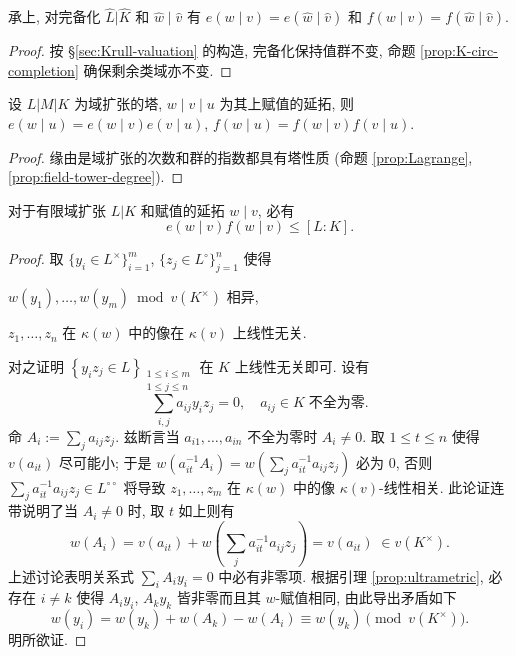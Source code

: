 \begin{proposition}\label{prop:ef-completion}
	承上, 对完备化 $\hat{L} | \hat{K}$ 和 $\hat{w} \mid \hat{v}$ 有 $e(w \mid v) = e(\hat{w} \mid \hat{v})$ 和 $f(w \mid v) = f(\hat{w} \mid \hat{v})$.
\end{proposition}
\begin{proof}
	按 \S\ref{sec:Krull-valuation} 的构造, 完备化保持值群不变, 命题 \ref{prop:K-circ-completion} 确保剩余类域亦不变.
\end{proof}

\begin{proposition}\label{prop:e-f-tower}
	设 $L|M|K$ 为域扩张的塔, $w \mid v \mid u$ 为其上赋值的延拓, 则 $e(w \mid u) = e(w \mid v)e(v \mid  u)$, $f(w \mid u) = f(w \mid v)f(v \mid u)$.
\end{proposition}
\begin{proof}
	缘由是域扩张的次数和群的指数都具有塔性质 (命题 \ref{prop:Lagrange}, \ref{prop:field-tower-degree}).
\end{proof}

\begin{proposition}\label{prop:fundamental-ineq}
	对于有限域扩张 $L|K$ 和赋值的延拓 $w \mid v$, 必有
	\[ e(w \mid v) f(w \mid v) \leq [L:K]. \]
\end{proposition}
\begin{proof}
	取 $\{y_i \in L^\times\}_{i=1}^m$, $\{z_j \in L^\circ \}_{j=1}^n$ 使得
	\begin{compactitem}
		\item $w(y_1), \ldots, w(y_m) \bmod v(K^\times)$ 相异,
		\item $z_1, \ldots, z_n$ 在 $\kappa(w)$ 中的像在 $\kappa(v)$ 上线性无关.
	\end{compactitem}
	对之证明 $\left\{ y_i z_j \in L \right\}_{\substack{1 \leq i \leq m \\ 1 \leq j \leq n}}$ 在 $K$ 上线性无关即可. 设有
	\[ \sum_{i,j} a_{ij} y_i z_j = 0, \quad a_{ij} \in K\; \text{不全为零}. \]
	命 $A_i := \sum_j a_{ij} z_j$. 兹断言当 $a_{i1}, \ldots, a_{in}$ 不全为零时 $A_i \neq 0$. 取 $1 \leq t \leq n$ 使得 $v(a_{it})$ 尽可能小; 于是 $w\left( a_{it}^{-1} A_i \right) = w\left( \sum_j a_{it}^{-1} a_{ij} z_j \right)$ 必为 $0$, 否则 $\sum_j a_{it}^{-1} a_{ij} z_j \in L^{\circ\circ}$ 将导致 $z_1, \ldots, z_m$ 在 $\kappa(w)$ 中的像 $\kappa(v)$-线性相关. 此论证连带说明了当 $A_i \neq 0$ 时, 取 $t$ 如上则有
	\[ w(A_i) = v(a_{it}) + w\left( \sum_j a_{it}^{-1} a_{ij} z_j \right) = v(a_{it}) \;\in v(K^\times). \]
	上述讨论表明关系式 $\sum_i A_i y_i = 0$ 中必有非零项. 根据引理 \ref{prop:ultrametric}, 必存在 $i \neq k$ 使得 $A_i y_i$, $A_k y_k$ 皆非零而且其 $w$-赋值相同, 由此导出矛盾如下
	\[ w(y_i) = w(y_k) + w(A_k) - w(A_i) \equiv w(y_k) \pmod {v(K^\times)}. \]
	明所欲证.
\end{proof}

